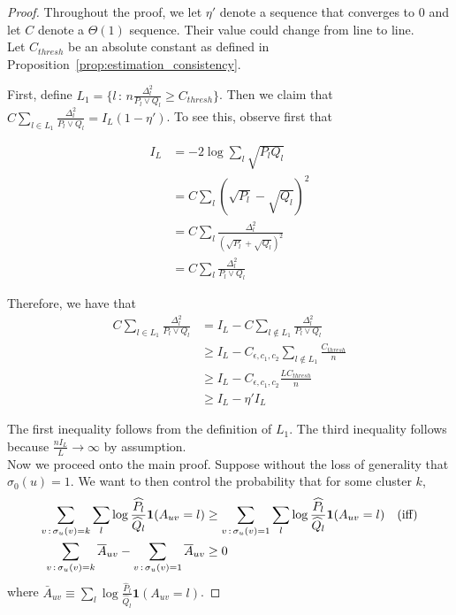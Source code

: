 \begin{proof}

Throughout the proof, we let $\eta'$ denote a sequence that converges to 0 and let $C$ denote a $\Theta(1)$ sequence. Their value could change from line to line. \\

Let $C_{thresh}$ be an absolute constant as defined in Proposition~\ref{prop:estimation_consistency}.

First, define $L_1 = \{ l \,:\, n \frac{\Delta_l^2}{P_l \vee Q_l} \geq C_{thresh} \}$. Then we claim that $C \sum_{l \in L_1} \frac{\Delta_l^2}{P_l \vee Q_l} = I_L ( 1 - \eta' )$. To see this, observe first that

\begin{align*}
I_L &= -2 \log \sum_l \sqrt{P_l Q_l} \\
  &= C \sum_l (\sqrt{P_l} - \sqrt{Q_l} )^2 \\
  &= C \sum_l \frac{\Delta_l^2}{(\sqrt{P_l} + \sqrt{Q_l})^2} \\
  &= C \sum_l \frac{\Delta_l^2}{P_l \vee Q_l} 
\end{align*}

Therefore, we have that
\begin{align*}
C \sum_{l \in L_1} \frac{\Delta_l^2}{P_l \vee Q_l} &= I_L - 
 C \sum_{l \notin L_1} \frac{\Delta_l^2}{P_l \vee Q_l} \\
 &\geq I_L - C_{\epsilon, c_1, c_2} \sum_{l \notin L_1} \frac{C_{thresh}}{n} \\
 &\geq I_L - C_{\epsilon, c_1, c_2} \frac{ L C_{thresh}}{n} \\
 &\geq I_L - \eta' I_L
\end{align*}

The first inequality follows from the definition of $L_1$. The third inequality follows because $\frac{n I_L}{L} \rightarrow \infty$ by assumption. \\


Now we proceed onto the main proof. Suppose without the loss of generality that $\sigma_0(u) = 1$.  We want to then control the probability that for some cluster $k$, 
\begin{align}
\sum_{v\,:\, \sigma_u(v)=k} \sum_l \log \frac{\widehat{P}_l}{\widehat{Q}_l} \mbox{\boldmath $1$}(A_{uv} = l) 
&\geq 
 \sum_{v\,:\, \sigma_u(v)=1} \sum_l \log \frac{\widehat{P}_l}{\widehat{Q}_l} \mbox{\boldmath $1$}(A_{uv} = l) 
  \quad \textrm{(iff)}  \nonumber \\
\sum_{v \,:\, \sigma_u(v) = k} \overline{A}_{uv} - \sum_{v\,:\, \sigma_u(v) = 1} \overline{A}_{uv} 
\label{eqn:bad_event1}
&\geq 0 
\end{align}
where $\bar{A}_{uv} \equiv \sum_l \log \frac{\hat{P}_l}{\hat{Q}_l} \mathbf{1}(A_{uv} = l)$. 


\end{proof}

